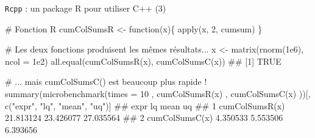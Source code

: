 \documentclass[12pt,ignorenonframetext,]{beamer}
\newenvironment{Shaded}{}{}
\newcommand{\KeywordTok}[1]{\textcolor[rgb]{0.00,0.00,1.00}{#1}}
\newcommand{\DataTypeTok}[1]{#1}
\newcommand{\DecValTok}[1]{#1}
\newcommand{\FloatTok}[1]{#1}
\newcommand{\StringTok}[1]{\textcolor[rgb]{0.00,0.50,0.50}{#1}}
\newcommand{\CommentTok}[1]{\textcolor[rgb]{0.00,0.50,0.00}{#1}}
\newcommand{\ControlFlowTok}[1]{\textcolor[rgb]{0.00,0.00,1.00}{#1}}
\newcommand{\NormalTok}[1]{#1}
\renewenvironment{Shaded}{\begin{snugshade}}{\end{snugshade}}
\begin{document}
\begin{frame}[fragile]{\texttt{Rcpp} : un package R pour utiliser C++
(3)}

\footnotesize

\begin{Shaded}
\begin{Highlighting}[]
\CommentTok{# Fonction R}
\NormalTok{cumColSumsR <-}\StringTok{ }\ControlFlowTok{function}\NormalTok{(x)\{}
  \KeywordTok{apply}\NormalTok{(x, }\DecValTok{2}\NormalTok{, cumsum)}
\NormalTok{\}}

\CommentTok{# Les deux fonctions produisent les mêmes résultats...}
\NormalTok{x <-}\StringTok{ }\KeywordTok{matrix}\NormalTok{(}\KeywordTok{rnorm}\NormalTok{(}\FloatTok{1e6}\NormalTok{), }\DataTypeTok{ncol =} \FloatTok{1e2}\NormalTok{)}
\KeywordTok{all.equal}\NormalTok{(}\KeywordTok{cumColSumsR}\NormalTok{(x), }\KeywordTok{cumColSumsC}\NormalTok{(x))}
\NormalTok{  ## [1] TRUE}

\CommentTok{# ... mais cumColSumsC() est beaucoup plus rapide !}
\KeywordTok{summary}\NormalTok{(}\KeywordTok{microbenchmark}\NormalTok{(}\DataTypeTok{times =} \DecValTok{10}
\NormalTok{  , }\KeywordTok{cumColSumsR}\NormalTok{(x)}
\NormalTok{  , }\KeywordTok{cumColSumsC}\NormalTok{(x)}
\NormalTok{))[, }\KeywordTok{c}\NormalTok{(}\StringTok{"expr"}\NormalTok{, }\StringTok{"lq"}\NormalTok{, }\StringTok{"mean"}\NormalTok{, }\StringTok{"uq"}\NormalTok{)]}
\NormalTok{  ##             expr        lq      mean        uq}
\NormalTok{  ## 1 cumColSumsR(x) 21.813124 23.426077 27.035564}
\NormalTok{  ## 2 cumColSumsC(x)  4.350533  5.553506  6.393656}
\end{Highlighting}
\end{Shaded}

\end{frame}
\end{document}
